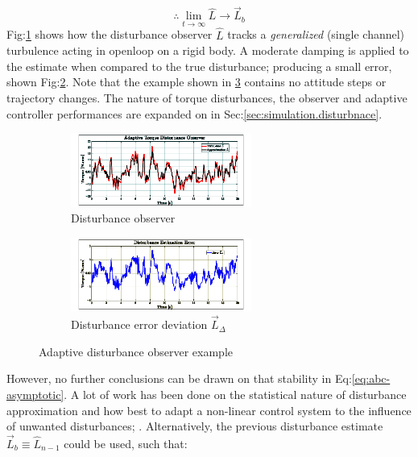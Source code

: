 {\begin{subequations}
\begin{equation}
\therefore\underset{t\rightarrow\infty}{\lim}\hat{L}\rightarrow\vec{L}_b
\end{equation}
\end{subequations}
Fig:\ref{fig:disturbance_L} shows how the disturbance observer $\hat{L}$ tracks a \emph{generalized} (single channel) turbulence acting in openloop on a rigid body. A moderate damping is applied to the estimate when compared to the true disturbance; producing a small error, shown Fig:\ref{fig:error_LR}. Note that the example shown in \ref{fig:example_L} contains no attitude steps or trajectory changes. The nature of torque disturbances, the observer and adaptive controller performances are expanded on in Sec:\ref{sec:simulation.disturbnace}.
\begin{figure}[hbtp]
\vspace{-6pt}
\centering
\begin{subfigure}{\textwidth}
\centering
\includegraphics[width=0.65\textwidth]{graphs/disturbance_L}
\vspace{-8pt}
\caption{Disturbance observer}
\label{fig:disturbance_L}
\end{subfigure}
\begin{subfigure}{\textwidth}
\centering
\includegraphics[width=0.65\textwidth]{graphs/error_LR}
\vspace{-8pt}
\caption{Disturbance error deviation $\vec{L}_\Delta$}
\label{fig:error_LR}
\end{subfigure}
\vspace{-6pt}
\caption{Adaptive disturbance observer example}
\label{fig:example_L}
\end{figure}
\par
However, no further conclusions can be drawn on that stability in Eq:\ref{eq:abc-asymptotic}. A lot of work has been done on the statistical nature of disturbance approximation and how best to adapt a non-linear control system to the influence of unwanted disturbances; \cite{nonlineardisturbance,disturbanceadaptivebackstepping,robusttrackingcontrol}. Alternatively, the previous disturbance estimate $\vec{L}_b\equiv\hat{L}_{n-1}$ could be used, such that:
}
